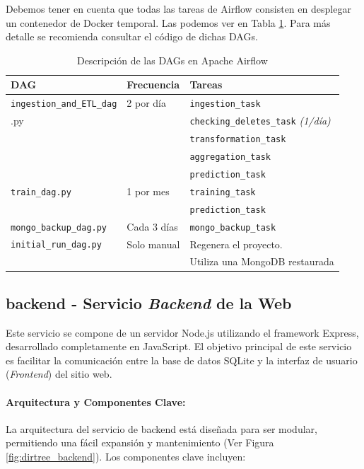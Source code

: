 Debemos tener en cuenta que todas las tareas de Airflow consisten en desplegar un contenedor de Docker temporal. Las podemos ver en Tabla \ref{table:dags}. Para más detalle se recomienda consultar el código de dichas DAGs.

\begin{table}[H]
\centering
\begin{tabular}{|l|l|l|}
\hline
\textbf{DAG} & \textbf{Frecuencia} & \textbf{Tareas} \\
\hline
\texttt{ingestion\_and\_ETL\_dag} & 2 por día & 
\texttt{ingestion\_task} \\
.py & & \texttt{checking\_deletes\_task} \textit{(1/día)} \\
& & \texttt{transformation\_task} \\
& & \texttt{aggregation\_task} \\
& & \texttt{prediction\_task} \\
\hline
\texttt{train\_dag.py} & 1 por mes & \texttt{training\_task} \\
& & \texttt{prediction\_task} \\
\hline
\texttt{mongo\_backup\_dag.py} & Cada 3 días & \texttt{mongo\_backup\_task} \\
\hline
\texttt{initial\_run\_dag.py} & Solo manual& Regenera el proyecto. \\
& & Utiliza una MongoDB restaurada \\
\hline
\end{tabular}
\caption{Descripción de las DAGs en Apache Airflow}
\label{table:dags}
\end{table}

\clearpage
\subsection{backend - Servicio \textit{Backend} de la Web}

Este servicio se compone de un servidor Node.js utilizando el framework Express, desarrollado completamente en JavaScript. El objetivo principal de este servicio es facilitar la comunicación entre la base de datos SQLite y la interfaz de usuario (\textit{Frontend}) del sitio web.

\paragraph{Arquitectura y Componentes Clave: } La arquitectura del servicio de backend está diseñada para ser modular, permitiendo una fácil expansión y mantenimiento (Ver Figura \ref{fig:dirtree_backend}). Los componentes clave incluyen:

